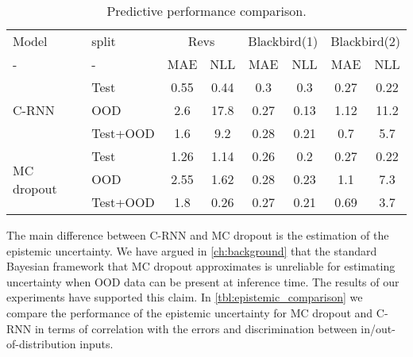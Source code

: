 \documentclass[../main.tex]{subfiles}
\begin{document}

\begin{table*}[htbp]
\centering
    \begin{tabular}{l l c c c c c c}  
        \toprule
        Model & split & \multicolumn{2}{c}{Revs} & \multicolumn{2}{c}{Blackbird(1)} & \multicolumn{2}{c}{Blackbird(2)}\\
        - & - & MAE & NLL & MAE & NLL & MAE & NLL \\
        \midrule
        \multirow{3}{*}{C-RNN} 
            & Test     & 0.55 & 0.44 & 0.3  & 0.3   & 0.27 & 0.22 \\  
            & OOD      & 2.6  & 17.8 & 0.27 & 0.13  & 1.12 & 11.2\\  
            & Test+OOD & 1.6  & 9.2  & 0.28 & 0.21  & 0.7  & 5.7\\ 

        \midrule
        \multirow{3}{*}{MC dropout} 
            & Test     & 1.26 & 1.14 & 0.26  & 0.2   & 0.27 & 0.22 \\  
            & OOD      & 2.55 & 1.62 & 0.28  & 0.23  & 1.1  &  7.3 \\  
            & Test+OOD & 1.8  & 0.26 & 0.27  & 0.21  & 0.69 & 3.7\\ 
        
        \toprule
    \end{tabular}
    \caption{Predictive performance comparison.}
    \label{tbl:comparison}
\end{table*}



The main difference between C-RNN and MC dropout is the estimation of the epistemic uncertainty. We have argued in \cref{ch:background} that the standard Bayesian framework that MC dropout approximates is unreliable for estimating uncertainty when OOD data can be present at inference time. The results of our experiments have supported this claim. In \cref{tbl:epistemic_comparison} we compare the performance of the epistemic uncertainty for MC dropout and C-RNN in terms of correlation with the errors and discrimination between in/out-of-distribution inputs. 
\end{document}
